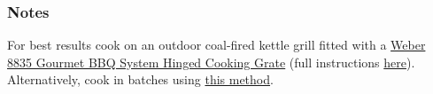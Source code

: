 \subsubsection{Notes}
For best results cook on an outdoor coal-fired kettle grill fitted with a \href{http://www.amazon.com/gp/product/B0044EQM9Q/?tag=serieats-20&link_code=ur2&creative=9325&camp=211189}{Weber 8835 Gourmet BBQ System Hinged Cooking Grate} (full instructions \href{http://www.seriouseats.com/2012/06/the-food-lab-for-the-best-stir-fry-fire-up-the-grill.html}{here}).
Alternatively, cook in batches using \href{http://www.seriouseats.com/2010/06/wok-skills-101-stir-frying-basics.html}{this method}.
